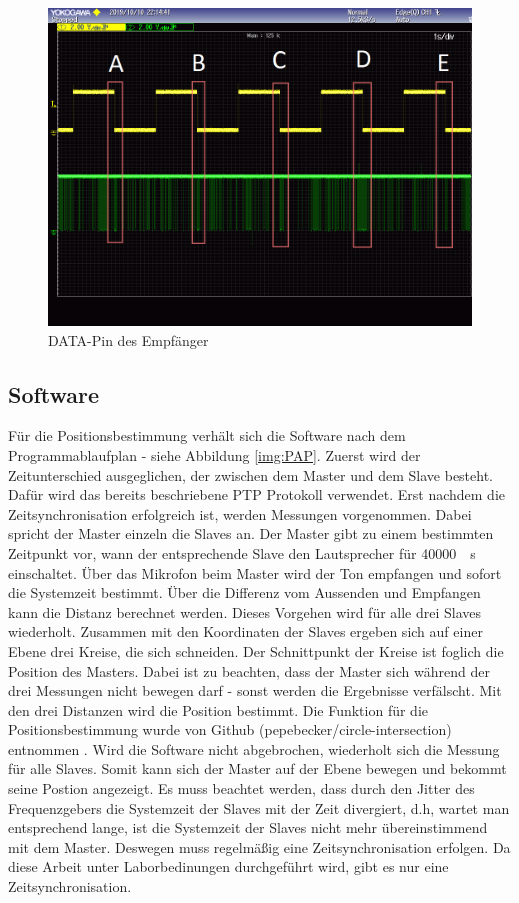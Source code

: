 \begin{figure}[H]
        \centering
        \hspace*{-1.7cm}
        \includegraphics[width=1.2\textwidth]{images/schmitt_trigger_billig_sender_bearbeitet.png}
        \caption{\si{DATA}-Pin des \funkempfaenger \platz Empfänger}    
        \label{img:ausgang_sender_pin}
\end{figure}

\subsection{Software}
Für die Positionsbestimmung verhält sich die Software nach dem Programmablaufplan - siehe Abbildung \ref{img:PAP}. Zuerst wird der Zeitunterschied ausgeglichen, der zwischen dem Master und dem Slave besteht. Dafür wird das bereits beschriebene PTP Protokoll verwendet. Erst nachdem die Zeitsynchronisation erfolgreich ist, werden Messungen vorgenommen. Dabei spricht der Master einzeln die Slaves an. Der Master gibt zu einem bestimmten Zeitpunkt vor, wann der entsprechende Slave den Lautsprecher für \SI{40000}{\mu\s} einschaltet. Über das Mikrofon beim Master wird der Ton empfangen und sofort die Systemzeit bestimmt. Über die Differenz vom Aussenden und Empfangen kann die Distanz berechnet werden. Dieses Vorgehen wird für alle drei Slaves wiederholt. Zusammen mit den Koordinaten der Slaves ergeben sich auf einer Ebene drei Kreise, die sich schneiden. Der Schnittpunkt der Kreise ist foglich die Position des Masters. Dabei ist zu beachten, dass der Master sich während der drei Messungen nicht bewegen darf - sonst werden die Ergebnisse verfälscht. Mit den drei Distanzen wird die Position bestimmt. Die Funktion für die Positionsbestimmung wurde von Github (pepebecker/circle-intersection) entnommen \cite{src_GITHUB_CODE}. Wird die Software nicht abgebrochen, wiederholt sich die Messung für alle Slaves. Somit kann sich der Master auf der Ebene bewegen und bekommt seine Postion angezeigt. Es muss beachtet werden, dass durch den Jitter des Frequenzgebers die Systemzeit der Slaves mit der Zeit divergiert, d.h, wartet man entsprechend lange, ist die Systemzeit der Slaves nicht mehr übereinstimmend mit dem Master. Deswegen muss regelmäßig eine Zeitsynchronisation erfolgen. Da diese Arbeit unter Laborbedinungen durchgeführt wird, gibt es nur eine Zeitsynchronisation.

